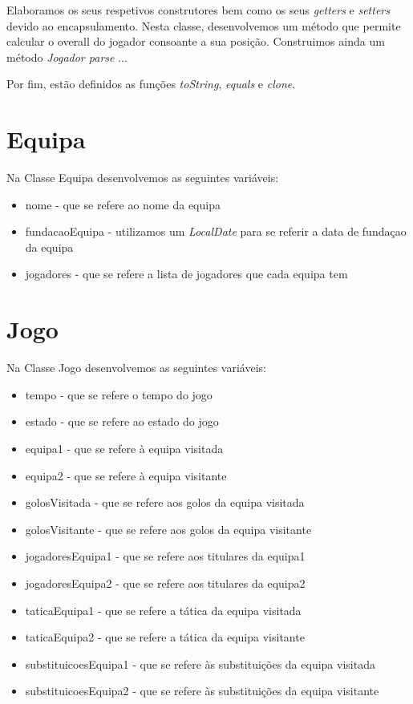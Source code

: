 \documentclass[a4paper,12pt]{article}
\begin{document}
    Elaboramos os seus respetivos construtores bem como os seus \emph{getters} e \emph{setters} devido ao encapsulamento.
Nesta classe, desenvolvemos um método que permite calcular o overall do jogador consoante a sua posição. Construimos
ainda um método \emph{ Jogador parse} ...\par
    Por fim, estão definidos as funções \emph{toString}, \emph{equals} e \emph{clone}.

\section{Equipa}
    Na Classe Equipa desenvolvemos as seguintes variáveis:
    \begin{itemize}
        \item nome - que se refere ao nome da equipa
        \item fundacaoEquipa - utilizamos um \emph{LocalDate} para se referir a data de fundaçao da equipa
        \item jogadores - que se refere a lista de jogadores que cada equipa tem
    \end{itemize}



\section{Jogo}
    Na Classe Jogo desenvolvemos as seguintes variáveis:
    \begin{itemize}
        \item tempo - que se refere o tempo do jogo
        \item estado - que se refere ao estado do jogo
        \item equipa1 - que se refere à equipa visitada
        \item equipa2 - que se refere à equipa visitante
        \item golosVisitada - que se refere aos golos da equipa visitada
        \item golosVisitante - que se refere aos golos da equipa visitante
        \item jogadoresEquipa1 - que se refere aos titulares da equipa1
        \item jogadoresEquipa2 - que se refere aos titulares da equipa2
        \item taticaEquipa1 - que se refere a tática da equipa visitada
        \item taticaEquipa2 - que se refere a tática da equipa visitante
        \item substituicoesEquipa1 - que se refere às substituições da equipa visitada
        \item substituicoesEquipa2 - que se refere às substituições da equipa visitante
    \end{itemize}
\end{document}
